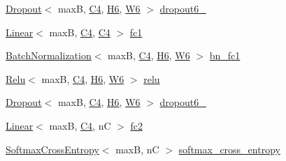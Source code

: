 \begin{DoxyCompactItemize}
\item 
\hyperlink{structDropout}{Dropout}$<$ maxB, \hyperlink{structVGG_a4d54a1cc3e99340dfb67e7252719c663}{C4}, \hyperlink{structVGG_aca7e136480c1e76d74bda917c1ddca97}{H6}, \hyperlink{structVGG_ada7bec62e12fac368b103ae3d8c59c0e}{W6} $>$ \hyperlink{structVGG_a3ed68e318387ff7e87b1c0d957d8d24a}{dropout6\+\_}
\item 
\hyperlink{structLinear}{Linear}$<$ maxB, \hyperlink{structVGG_a4d54a1cc3e99340dfb67e7252719c663}{C4}, \hyperlink{structVGG_a4d54a1cc3e99340dfb67e7252719c663}{C4} $>$ \hyperlink{structVGG_aca67ef058fa46d4f74022f308c72ad6c}{fc1}
\item 
\hyperlink{structBatchNormalization}{Batch\+Normalization}$<$ maxB, \hyperlink{structVGG_a4d54a1cc3e99340dfb67e7252719c663}{C4}, \hyperlink{structVGG_aca7e136480c1e76d74bda917c1ddca97}{H6}, \hyperlink{structVGG_ada7bec62e12fac368b103ae3d8c59c0e}{W6} $>$ \hyperlink{structVGG_a6a98e7662114881d493b635ca57fbf28}{bn\+\_\+fc1}
\item 
\hyperlink{structRelu}{Relu}$<$ maxB, \hyperlink{structVGG_a4d54a1cc3e99340dfb67e7252719c663}{C4}, \hyperlink{structVGG_aca7e136480c1e76d74bda917c1ddca97}{H6}, \hyperlink{structVGG_ada7bec62e12fac368b103ae3d8c59c0e}{W6} $>$ \hyperlink{structVGG_acc01c963dd716345709ab91f5eb6e2e3}{relu}
\item 
\hyperlink{structDropout}{Dropout}$<$ maxB, \hyperlink{structVGG_a4d54a1cc3e99340dfb67e7252719c663}{C4}, \hyperlink{structVGG_aca7e136480c1e76d74bda917c1ddca97}{H6}, \hyperlink{structVGG_ada7bec62e12fac368b103ae3d8c59c0e}{W6} $>$ \hyperlink{structVGG_abecd584b5b4bf336077b181e4f3e6f50}{dropout6\+\_}
\item 
\hyperlink{structLinear}{Linear}$<$ maxB, \hyperlink{structVGG_a4d54a1cc3e99340dfb67e7252719c663}{C4}, nC $>$ \hyperlink{structVGG_a422a4d5100d100bb361155b1f093ebf7}{fc2}
\item 
\hyperlink{structSoftmaxCrossEntropy}{Softmax\+Cross\+Entropy}$<$ maxB, nC $>$ \hyperlink{structVGG_af4bbc09cef74dbbff99b5a35f2c40608}{softmax\+\_\+cross\+\_\+entropy}
\end{DoxyCompactItemize}
